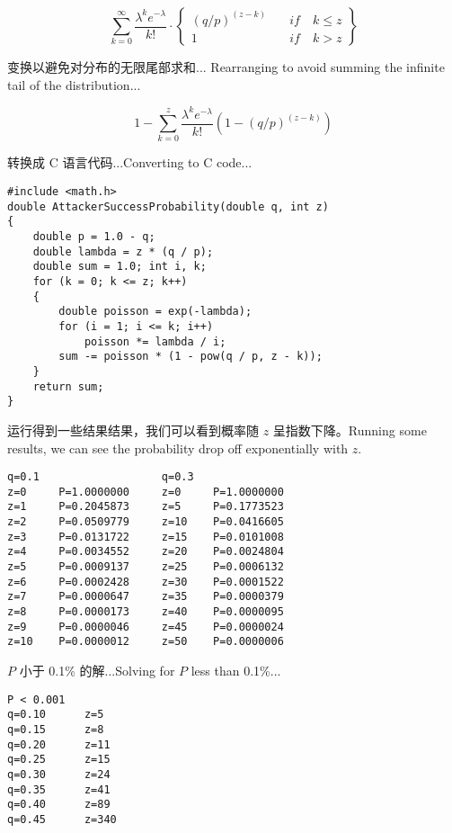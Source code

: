 \documentclass{ctexart}%
\renewcommand{\leq}{\leqslant} %
\begin{document}
$$
\sum_{k = 0}^{\infty} \frac{\lambda^{k} e^{-\lambda}}{k !} \cdot\left\{\begin{array}{cc}
(q / p)^{(z-k)} &\quad if\quad k \leq z \\
1 &\quad if\quad k>z
\end{array}\right\}
$$

变换以避免对分布的无限尾部求和...
Rearranging to avoid summing the infinite tail of the distribution...

$$
1-\sum_{k=0}^{z} \frac{\lambda^{k} e^{-\lambda}}{k !}\left(1-(q / p)^{(z-k)}\right)
$$

转换成 C 语言代码...Converting to C code...

\lstset{basicstyle=\ttfamily}
\begin{lstlisting}
#include <math.h> 
double AttackerSuccessProbability(double q, int z) 
{
	double p = 1.0 - q;
	double lambda = z * (q / p); 
	double sum = 1.0; int i, k;
	for (k = 0; k <= z; k++)
	{
		double poisson = exp(-lambda);
		for (i = 1; i <= k; i++)
			poisson *= lambda / i; 
		sum -= poisson * (1 - pow(q / p, z - k));
	} 
	return sum;
}
\end{lstlisting}

运行得到一些结果结果，我们可以看到概率随 $z$ 呈指数下降。Running some results, we can see the probability drop off exponentially with $z$.
{}
\begin{lstlisting}
q=0.1                   q=0.3
z=0     P=1.0000000     z=0     P=1.0000000
z=1     P=0.2045873     z=5     P=0.1773523
z=2     P=0.0509779     z=10    P=0.0416605
z=3     P=0.0131722     z=15    P=0.0101008
z=4     P=0.0034552     z=20    P=0.0024804
z=5     P=0.0009137     z=25    P=0.0006132
z=6     P=0.0002428     z=30    P=0.0001522
z=7     P=0.0000647     z=35    P=0.0000379
z=8     P=0.0000173     z=40    P=0.0000095
z=9     P=0.0000046     z=45    P=0.0000024
z=10    P=0.0000012     z=50    P=0.0000006
\end{lstlisting}

$P$ 小于 0.1\% 的解...Solving for $P$ less than 0.1\%...
\begin{lstlisting}
P < 0.001 
q=0.10      z=5
q=0.15      z=8
q=0.20      z=11
q=0.25      z=15
q=0.30      z=24
q=0.35      z=41
q=0.40      z=89
q=0.45      z=340
\end{lstlisting}
\end{document}
